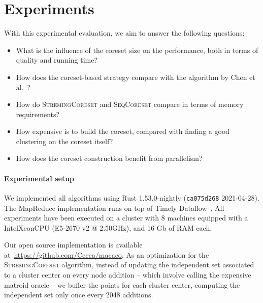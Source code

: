 \section{Experiments}

\newcommand{\mc}[1]{{\color{red} --- MC: #1 ---}}

\graphicspath{{../imgs/}}

\newcommand{\data}[1]{\texttt{#1}}
\newcommand{\higgs}{\texttt{Higgs}\xspace}
\newcommand{\phones}{\texttt{Phones}\xspace}
\newcommand{\wiki}{\texttt{Wiki}\xspace}
\newcommand{\chen}{\textsc{ChenEtAl}\xspace}
\newcommand{\seq}{\textsc{SeqCoreset}\xspace}
\newcommand{\stream}{\textsc{StremingCoreset}\xspace}
\newcommand{\mapr}{\textsc{MRCoreset}\xspace}

With this experimental evaluation, we aim to answer the following questions:
\begin{itemize}
    \item What is the influence of the coreset size on the performance, 
        both in terms of quality and running time?
    \item How does the coreset-based strategy compare with the algorithm 
        by Chen et al.~\cite{DBLP:journals/algorithmica/ChenLLW16}?
    \item How do \stream and \seq compare in terms of memory requirements?
    \item How expensive is to build the coreset, compared with finding
        a good clustering on the coreset itself?
    \item How does the coreset construction benefit from parallelism?
\end{itemize}

\paragraph*{Experimental setup}
We implemented all algorithms using Rust 1.53.0-nightly (\texttt{ca075d268} 2021-04-28).
The MapReduce implementation runs on top of Timely Dataflow~\cite{DBLP:journals/cacm/MurrayMIIBA16}.
All experiments have been executed on a cluster with 8 machines equipped
with a Intel\textregistered Xeon\textregistered CPU (E5-2670 v2 @ 2.50GHz), and 16 Gb of RAM each.

Our open source implementation is available at~\url{https://github.com/Cecca/macaco}.
As an optimization for the \stream algorithm, instead of updating the independent set associated to a cluster center on every node addition
-- which involve calling the expensive matroid oracle -- we buffer the points for each cluster center,
computing the independent set only once every 2048 additions.

